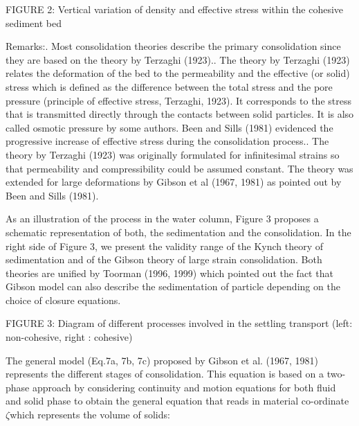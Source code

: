 \begin{center}
FIGURE 2: Vertical variation of density and effective stress within the
cohesive sediment bed
\end{center}

Remarks:. Most consolidation theories describe the primary consolidation since they
are based on the theory by Terzaghi (1923).. The theory by Terzaghi (1923) relates the deformation of the bed to the
permeability and the effective (or solid) stress which is defined as the
difference between the total stress and the pore pressure (principle of
effective stress, Terzaghi, 1923). It corresponds to the stress that is
transmitted directly through the contacts between solid particles. It is
also called osmotic pressure by some authors. Been and Sills (1981)
evidenced the progressive increase of effective stress during the
consolidation process.. The theory by Terzaghi (1923) was originally formulated for infinitesimal
strains so that permeability and compressibility could be assumed constant.
The theory was extended for large deformations by Gibson et al (1967, 1981)
as pointed out by Been and Sills (1981).

As an illustration of the process in the water column, Figure 3 proposes a
schematic representation of both, the sedimentation and the consolidation.
In the right side of Figure 3, we present the validity range of the Kynch
theory of sedimentation and of the Gibson theory of large strain
consolidation.\newline
Both theories are unified by Toorman (1996, 1999) which pointed out the fact
that Gibson model can also describe the sedimentation of particle depending
on the choice of closure equations.


\begin{center}
FIGURE 3: Diagram of different processes involved in the settling transport
(left: non-cohesive, right : cohesive)
\end{center}

The general model (Eq.7a, 7b, 7c) proposed by Gibson et al. (1967, 1981)
represents the different stages of consolidation. This equation is based on
a two-phase approach by considering continuity and motion equations for both
fluid and solid phase to obtain the general equation that reads in material
co-ordinate $\zeta $which represents the volume of solids:

